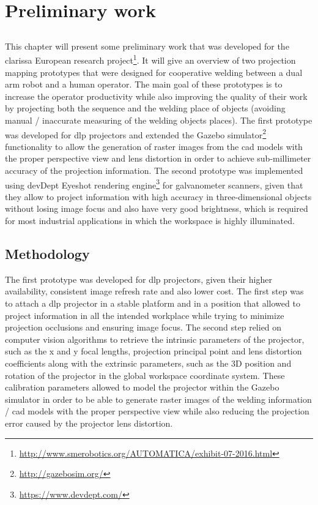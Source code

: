 \chapter{Preliminary work}\label{chap:preliminary-work}

\section*{}

This chapter will present some preliminary work that was developed for the \gls{clarissa} European research project\footnote{\url{http://www.smerobotics.org/AUTOMATICA/exhibit-07-2016.html}}. It will give an overview of two projection mapping prototypes that were designed for cooperative welding between a dual arm robot and a human operator. The main goal of these prototypes is to increase the operator productivity while also improving the quality of their work by projecting both the sequence and the welding place of objects (avoiding manual / inaccurate measuring of the welding objects places). The first prototype was developed for \gls{dlp} projectors and extended the Gazebo simulator\footnote{\url{http://gazebosim.org/}} functionality to allow the generation of raster images from the \gls{cad} models with the proper perspective view and lens distortion in order to achieve sub-millimeter accuracy of the projection information. The second prototype was implemented using devDept Eyeshot rendering engine\footnote{\url{https://www.devdept.com/}} for galvanometer scanners, given that they allow to project information with high accuracy in three-dimensional objects without losing image focus and also have very good brightness, which is required for most industrial applications in which the workspace is highly illuminated.


\section{Methodology}

The first prototype was developed for \gls{dlp} projectors, given their higher availability, consistent image refresh rate and also lower cost. The first step was to attach a \gls{dlp} projector in a stable platform and in a position that allowed to project information in all the intended workplace while trying to minimize projection occlusions and ensuring image focus. The second step relied on computer vision algorithms to retrieve the intrinsic parameters of the projector, such as the x and y focal lengths, projection principal point and lens distortion coefficients along with the extrinsic parameters, such as the 3D position and rotation of the projector in the global workspace coordinate system. These calibration parameters allowed to model the projector within the Gazebo simulator in order to be able to generate raster images of the welding information / \gls{cad} models with the proper perspective view while also reducing the projection error caused by the projector lens distortion.

